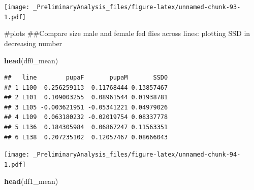 \documentclass[
]{article}
\newenvironment{Shaded}{\begin{snugshade}}{\end{snugshade}}
\newcommand{\DataTypeTok}[1]{\textcolor[rgb]{0.13,0.29,0.53}{#1}}
\newcommand{\FloatTok}[1]{\textcolor[rgb]{0.00,0.00,0.81}{#1}}
\newcommand{\KeywordTok}[1]{\textcolor[rgb]{0.13,0.29,0.53}{\textbf{#1}}}
\newcommand{\NormalTok}[1]{#1}
\newcommand{\OperatorTok}[1]{\textcolor[rgb]{0.81,0.36,0.00}{\textbf{#1}}}
\newcommand{\StringTok}[1]{\textcolor[rgb]{0.31,0.60,0.02}{#1}}
\begin{document}
\texttt{[image: \_PreliminaryAnalysis\_files/figure-latex/unnamed-chunk-93-1.pdf]}

\#plots \#\#Compare size male and female fed flies across lines:
plotting SSD in decreasing number

\begin{Shaded}
\begin{Highlighting}[]
\KeywordTok{head}\NormalTok{(df0_mean)}
\end{Highlighting}
\end{Shaded}

\begin{verbatim}
##   line        pupaF       pupaM       SSD0
## 1 L100  0.256259113  0.11768444 0.13857467
## 2 L101  0.109003255  0.08961544 0.01938781
## 3 L105 -0.003621951 -0.05341221 0.04979026
## 4 L109  0.063180232 -0.02019754 0.08337778
## 5 L136  0.184305984  0.06867247 0.11563351
## 6 L138  0.207235102  0.12057467 0.08666043
\end{verbatim}

\begin{Shaded}
\end{Shaded}

\texttt{[image: \_PreliminaryAnalysis\_files/figure-latex/unnamed-chunk-94-1.pdf]}

\begin{Shaded}
\begin{Highlighting}[]
\KeywordTok{head}\NormalTok{(df1_mean)}
\end{Highlighting}
\end{Shaded}
\end{document}
